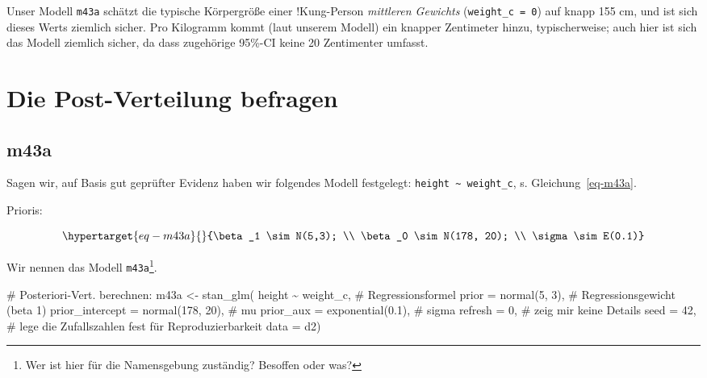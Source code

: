 \documentclass[
  a4paper,
  DIV=11]{scrreprt}
\newenvironment{Shaded}{\begin{snugshade}}{\end{snugshade}}
\newcommand{\AttributeTok}[1]{\textcolor[rgb]{0.40,0.45,0.13}{#1}}
\newcommand{\CommentTok}[1]{\textcolor[rgb]{0.37,0.37,0.37}{#1}}
\newcommand{\DecValTok}[1]{\textcolor[rgb]{0.68,0.00,0.00}{#1}}
\newcommand{\FloatTok}[1]{\textcolor[rgb]{0.68,0.00,0.00}{#1}}
\newcommand{\FunctionTok}[1]{\textcolor[rgb]{0.28,0.35,0.67}{#1}}
\newcommand{\NormalTok}[1]{\textcolor[rgb]{0.00,0.23,0.31}{#1}}
\newcommand{\OtherTok}[1]{\textcolor[rgb]{0.00,0.23,0.31}{#1}}
\newcommand{\SpecialCharTok}[1]{\textcolor[rgb]{0.37,0.37,0.37}{#1}}
\theoremstyle{definition}
\theoremstyle{remark}
\begin{document}
Unser Modell \texttt{m43a} schätzt die typische Körpergröße einer
!Kung-Person \emph{mittleren Gewichts} (\texttt{weight\_c\ =\ 0}) auf
knapp 155 cm, und ist sich dieses Werts ziemlich sicher. Pro Kilogramm
kommt (laut unserem Modell) ein knapper Zentimeter hinzu,
typischerweise; auch hier ist sich das Modell ziemlich sicher, da dass
zugehörige 95\%-CI keine 20 Zentimenter umfasst.

\hypertarget{die-post-verteilung-befragen-1}{%
\section{Die Post-Verteilung
befragen}\label{die-post-verteilung-befragen-1}}

\hypertarget{m43a}{%
\subsection{m43a}\label{m43a}}

Sagen wir, auf Basis gut geprüfter Evidenz haben wir folgendes Modell
festgelegt: \texttt{height\ \textasciitilde{}\ weight\_c}, s.
Gleichung~\ref{eq-m43a}.

Prioris:

\begin{equation}\protect\hypertarget{eq-m43a}{}{\beta_1 \sim N(5,3); \\
\beta_0 \sim N(178, 20); \\
\sigma \sim E(0.1)}\label{eq-m43a}\end{equation}

Wir nennen das Modell \texttt{m43a}\footnote{Wer ist hier für die
  Namensgebung zuständig? Besoffen oder was?}.

\begin{Shaded}
\begin{Highlighting}[]
\CommentTok{\# Posteriori{-}Vert. berechnen:}
\NormalTok{m43a }\OtherTok{\textless{}{-}}
  \FunctionTok{stan\_glm}\NormalTok{(}
\NormalTok{    height }\SpecialCharTok{\textasciitilde{}}\NormalTok{ weight\_c,  }\CommentTok{\# Regressionsformel}
    \AttributeTok{prior =} \FunctionTok{normal}\NormalTok{(}\DecValTok{5}\NormalTok{, }\DecValTok{3}\NormalTok{),  }\CommentTok{\# Regressionsgewicht (beta 1)}
    \AttributeTok{prior\_intercept =} \FunctionTok{normal}\NormalTok{(}\DecValTok{178}\NormalTok{, }\DecValTok{20}\NormalTok{),  }\CommentTok{\# mu}
    \AttributeTok{prior\_aux =} \FunctionTok{exponential}\NormalTok{(}\FloatTok{0.1}\NormalTok{),  }\CommentTok{\# sigma}
    \AttributeTok{refresh =} \DecValTok{0}\NormalTok{,  }\CommentTok{\# zeig mir keine Details}
    \AttributeTok{seed =} \DecValTok{42}\NormalTok{,  }\CommentTok{\# lege die Zufallszahlen fest für Reproduzierbarkeit}
    \AttributeTok{data =}\NormalTok{ d2)}
\end{Highlighting}
\end{Shaded}
\end{document}

